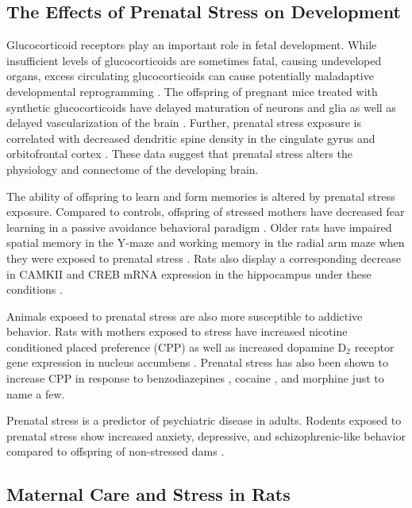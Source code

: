 \documentclass[12pt,twoside]{reedthesis}
\begin{document}
\subsection{The Effects of Prenatal Stress on Development}
Glucocorticoid receptors play an important role in fetal development. While
insufficient levels of glucocorticoids are sometimes fatal, causing undeveloped organs,
excess circulating glucocorticoids can cause potentially maladaptive developmental
reprogramming \citep{2017Nrid}. The offspring of pregnant mice treated with synthetic glucocorticoids
 have delayed maturation of neurons and glia as well as delayed vascularization
 of the brain \citep{gravanis_hormones_2011}. Further, prenatal stress exposure is correlated with
 decreased dendritic spine density in the cingulate gyrus and orbitofrontal
 cortex \citep{murmu_changes_2006}. These data suggest that prenatal stress alters the
 physiology and connectome of the developing brain.

 The ability of offspring to learn and form memories is altered by prenatal
 stress exposure. Compared to controls, offspring of stressed mothers have decreased fear learning in a
 passive avoidance behavioral paradigm \citep{sofiabadi_effects_2018}. Older rats have impaired spatial memory in the Y-maze and
 working memory in the radial arm maze when they were exposed to prenatal stress
 \citep{vallee_long-term_1999}. Rats also display a corresponding
 decrease in CAMKII and CREB mRNA expression in the hippocampus under these
 conditions \citep{sun_prenatal_2017}. 

 Animals exposed to prenatal stress are also more susceptible to addictive behavior.
 Rats with mothers exposed to stress have increased nicotine conditioned placed
 preference (CPP) as well as increased dopamine D$_2$ receptor gene expression
 in nucleus accumbens \citep{said_prenatal_2015}. Prenatal stress has also been shown to
 increase CPP in response to benzodiazepines \citep{lakehayli_prenatal_2015}, cocaine
 \citep{pastor_prenatal_2018}, and morphine \citep{vey_stress_2016} just to name a few.

 Prenatal stress is a predictor of psychiatric disease in adults.
 Rodents exposed to prenatal stress show increased anxiety, depressive, and
 schizophrenic-like behavior compared to offspring of non-stressed dams
 \citep{weinstock_prenatal_2017}. 

 \subsection{Maternal Care and Stress in Rats}
  
\end{document}
